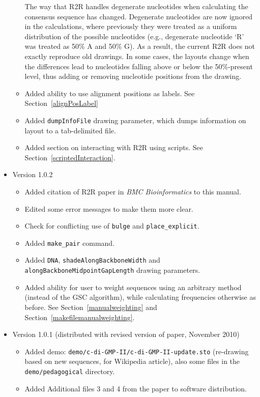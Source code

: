 \documentclass[letterpaper,12pt]{report}
\begin{document}
\begin{itemize}
\begin{itemize}
The way that R2R handles degenerate nucleotides when calculating the consensus sequence has changed.  Degenerate nucleotides are now ignored in the calculations, where previously they were treated as a uniform distribution of the possible nucleotides (e.g., degenerate nucleotide `R' was treated as 50\% A and 50\% G).  As a result, the current R2R does not exactly reproduce old drawings.  In some cases, the layouts change when the differences lead to nucleotides falling above or below the 50\%-present level, thus adding or removing nucleotide positions from the drawing.
        \item Added ability to use alignment positions as labels.  See Section~\ref{alignPosLabel}
	\item Added {\tt dumpInfoFile} drawing parameter, which dumps information on layout to a tab-delimited file.
        \item Added section on interacting with R2R using scripts.  See Section~\ref{scriptedInteraction}.
        \end{itemize}
\item Version 1.0.2
	\begin{itemize}
	\item Added citation of R2R paper in {\it BMC Bioinformatics} to this manual.
	\item Edited some error messages to make them more clear.
	\item Check for conflicting use of {\tt bulge} and {\tt place\_explicit}.
	\item Added {\tt make\_pair} command.
	\item Added {\tt DNA}, {\tt shadeAlongBackboneWidth} and {\tt alongBackboneMidpointGapLength} drawing parameters.
	\item Added ability for user to weight sequences using an arbitrary method (instead of the GSC algorithm), while calculating frequencies otherwise as before.  See Section~\ref{manualweighting} and Section~\ref{makefilemanualweighting}.
	\end{itemize}
\item Version 1.0.1 (distributed with revised version of paper, November 2010)
	\begin{itemize}
	\item Added demo: {\tt demo/c-di-GMP-II/c-di-GMP-II-update.sto} (re-drawing based on new sequences, for Wikipedia article), also some files in the {\tt demo/pedagogical} directory.
	\item Added Additional files 3 and 4 from the paper to software distribution.

\end{itemize}
\end{itemize}
\end{document}

